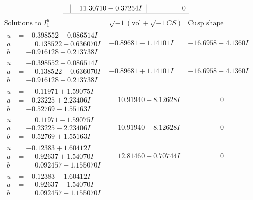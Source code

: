 \documentclass[1p]{elsarticle_modified}
\theoremstyle{definition}
\newcommand{\I}{\sqrt{-1}}
\begin{document}
$$\begin{array}{c|c|c}
 & \phantom{-}11.30710 - 0.37254 I & \phantom{-0.000000 } 0\\
 \hline 
 \end{array}$$\newpage$$\begin{array}{c|c|c}  
\text{Solutions to }I^u_{1}& \I (\text{vol} + \sqrt{-1}CS) & \text{Cusp shape}\\
 \hline 
\begin{aligned}
u &= -0.398552 + 0.086514 I \\
a &= \phantom{-}0.138522 - 0.636070 I \\
b &= -0.916128 - 0.213738 I\end{aligned}
 & -0.89681 - 1.14101 I & -16.6958 + 4.1360 I \\ \hline\begin{aligned}
u &= -0.398552 - 0.086514 I \\
a &= \phantom{-}0.138522 + 0.636070 I \\
b &= -0.916128 + 0.213738 I\end{aligned}
 & -0.89681 + 1.14101 I & -16.6958 - 4.1360 I \\ \hline\begin{aligned}
u &= \phantom{-}0.11971 + 1.59075 I \\
a &= -0.23225 + 2.23406 I \\
b &= -0.52769 - 1.55163 I\end{aligned}
 & \phantom{-}10.91940 - 8.12628 I & \phantom{-0.000000 } 0 \\ \hline\begin{aligned}
u &= \phantom{-}0.11971 - 1.59075 I \\
a &= -0.23225 - 2.23406 I \\
b &= -0.52769 + 1.55163 I\end{aligned}
 & \phantom{-}10.91940 + 8.12628 I & \phantom{-0.000000 } 0 \\ \hline\begin{aligned}
u &= -0.12383 + 1.60412 I \\
a &= \phantom{-}0.92637 + 1.54070 I \\
b &= \phantom{-}0.092457 - 1.155070 I\end{aligned}
 & \phantom{-}12.81460 + 0.70744 I & \phantom{-0.000000 } 0 \\ \hline\begin{aligned}
u &= -0.12383 - 1.60412 I \\
a &= \phantom{-}0.92637 - 1.54070 I \\
b &= \phantom{-}0.092457 + 1.155070 I\end{aligned}

\end{array}$$
\end{document}
